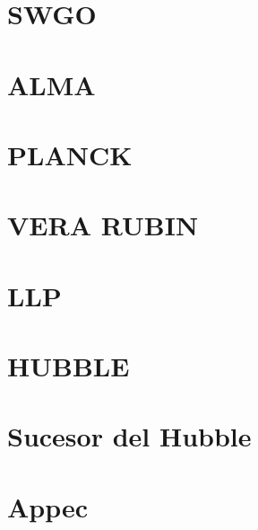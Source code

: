  \section{SWGO}
 \section{ALMA}
 \section{PLANCK}
 \section{VERA RUBIN}
 \section{LLP}
 \section{HUBBLE }
 \section{Sucesor del Hubble}
 \section{Appec}
 \section{}